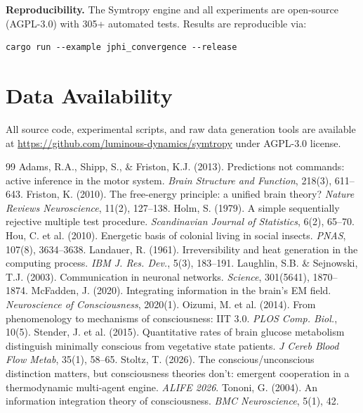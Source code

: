 \documentclass[entropy,article]{Definitions/mdpi}
\begin{document}
\textbf{Reproducibility.} The Symtropy engine and all experiments are open-source (AGPL-3.0) with 305+ automated tests. Results are reproducible via:
\begin{verbatim}
cargo run --example jphi_convergence --release
\end{verbatim}

\section*{Data Availability}

All source code, experimental scripts, and raw data generation tools are available at \url{https://github.com/luminous-dynamics/symtropy} under AGPL-3.0 license.


\begin{thebibliography}{99}
 Adams, R.A., Shipp, S., \& Friston, K.J. (2013). Predictions not commands: active inference in the motor system. \emph{Brain Structure and Function}, 218(3), 611--643.
 Friston, K. (2010). The free-energy principle: a unified brain theory? \emph{Nature Reviews Neuroscience}, 11(2), 127--138.
 Holm, S. (1979). A simple sequentially rejective multiple test procedure. \emph{Scandinavian Journal of Statistics}, 6(2), 65--70.
 Hou, C. et al. (2010). Energetic basis of colonial living in social insects. \emph{PNAS}, 107(8), 3634--3638.
 Landauer, R. (1961). Irreversibility and heat generation in the computing process. \emph{IBM J. Res. Dev.}, 5(3), 183--191.
 Laughlin, S.B. \& Sejnowski, T.J. (2003). Communication in neuronal networks. \emph{Science}, 301(5641), 1870--1874.
 McFadden, J. (2020). Integrating information in the brain's EM field. \emph{Neuroscience of Consciousness}, 2020(1).
 Oizumi, M. et al. (2014). From phenomenology to mechanisms of consciousness: IIT 3.0. \emph{PLOS Comp. Biol.}, 10(5).
 Stender, J. et al. (2015). Quantitative rates of brain glucose metabolism distinguish minimally conscious from vegetative state patients. \emph{J Cereb Blood Flow Metab}, 35(1), 58--65.
 Stoltz, T. (2026). The conscious/unconscious distinction matters, but consciousness theories don't: emergent cooperation in a thermodynamic multi-agent engine. \emph{ALIFE 2026}.
 Tononi, G. (2004). An information integration theory of consciousness. \emph{BMC Neuroscience}, 5(1), 42.
\end{thebibliography}
\end{document}
